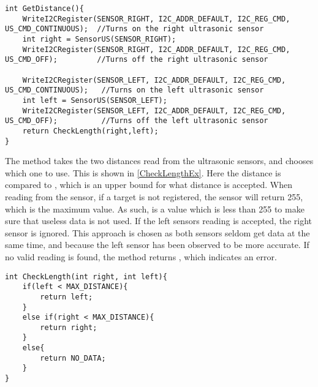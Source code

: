 \begin{minipage}[H]{\linewidth}
\begin{lstlisting}[caption = Method for reading the distance from the ultrasonic distance sensors., label = GetDistanceFunc] 
int GetDistance(){
    WriteI2CRegister(SENSOR_RIGHT, I2C_ADDR_DEFAULT, I2C_REG_CMD, US_CMD_CONTINUOUS);  //Turns on the right ultrasonic sensor
    int right = SensorUS(SENSOR_RIGHT);
    WriteI2CRegister(SENSOR_RIGHT, I2C_ADDR_DEFAULT, I2C_REG_CMD, US_CMD_OFF);         //Turns off the right ultrasonic sensor

    WriteI2CRegister(SENSOR_LEFT, I2C_ADDR_DEFAULT, I2C_REG_CMD, US_CMD_CONTINUOUS);   //Turns on the left ultrasonic sensor
    int left = SensorUS(SENSOR_LEFT);
    WriteI2CRegister(SENSOR_LEFT, I2C_ADDR_DEFAULT, I2C_REG_CMD, US_CMD_OFF);          //Turns off the left ultrasonic sensor
    return CheckLength(right,left);
}
\end{lstlisting}
\end{minipage}

The  method takes the two distances read from the ultrasonic
sensors, and chooses which one to use. This is shown in \autoref{CheckLengthEx}.
Here the distance is compared to , which is an upper bound
for what distance is accepted. When reading from the sensor, if a target is not
registered, the sensor will return 255, which is the maximum value. As such,
 is a value which is less than 255 to make sure that
useless data is not used. If the left sensors reading is accepted, the right
sensor is ignored. This approach is chosen as both sensors seldom get data at
the same time, and because the left sensor has been observed to be more
accurate. If no valid reading is found, the method returns ,
which indicates an error.\nl

\begin{minipage}[H]{\linewidth}
\begin{lstlisting}[caption = CheckLength method which chooses the best input distance., label = CheckLengthEx] 
int CheckLength(int right, int left){
    if(left < MAX_DISTANCE){
        return left;
    }
    else if(right < MAX_DISTANCE){
        return right;
    }
    else{
        return NO_DATA;
    }
}
\end{lstlisting}
\end{minipage}
